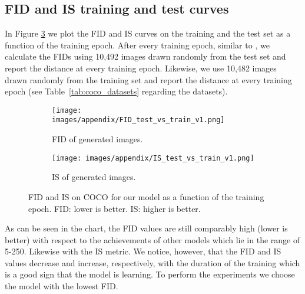 \documentclass[a4paper,12pt]{report}
\begin{document}
\subsection{FID and IS training and test curves}\label{sec:train_vs_test_FID}
In Figure \ref{fig:fid_is_metrics} we plot the FID and IS curves on the training and the test set as a function of the training epoch. After every training epoch, similar to \cite{StyleGAN}, we calculate the FIDs using 10,492 images drawn randomly from the test set and report the distance at every training epoch. Likewise, we use 10,482 images drawn randomly from the training set and report the distance at every training epoch (see Table~\ref{tab:coco_datasets} regarding the datasets). 
\begin{figure}[h]
\centering
\begin{subfigure}{0.49\textwidth}
\texttt{[image: images/appendix/FID\_test\_vs\_train\_v1.png]}
\caption{FID of generated images.}
\label{fig:fid_test_train}
\end{subfigure}
\begin{subfigure}{0.49\textwidth}
\texttt{[image: images/appendix/IS\_test\_vs\_train\_v1.png]}
\caption{IS of generated images.}
\label{fig:is_test_train}
\end{subfigure}
\caption{FID and IS on COCO for our model as a function of the training epoch. FID: lower is better. IS: higher is better.}
\label{fig:fid_is_metrics}
\end{figure}
As can be seen in the chart, the FID values are still comparably high (lower is better) with respect to the achievements of other models which lie in the range of 5-250. Likewise with the IS metric. We notice, however, that the FID and IS values decrease and increase, respectively, with the duration of the training which is a good sign that the model is learning. To perform the experiments we choose the model with the lowest FID.



\end{document}
